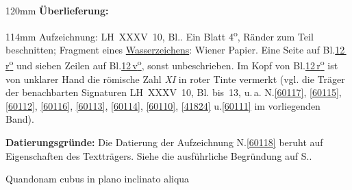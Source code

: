 %
\frenchspacing%
\begin{ledgroupsized}[r]{120mm}%
\footnotesize%
\pstart%
\noindent\textbf{Überlieferung:}%
\pend%
\end{ledgroupsized}%
\begin{ledgroupsized}[r]{114mm}%
\footnotesize%
\pstart%
\parindent -6mm%
%
Aufzeichnung:
LH~XXXV~10, Bl..
Ein Blatt 4\textsuperscript{o},
Ränder zum Teil beschnitten;
Fragment eines \href{\Scan{LH_35_10_14_012wz}}{Wasserzeichens}:
Wiener Papier.
Eine Seite auf Bl.\;\href{\Scan{LH_35_10_14_012r}}{12\,r\textsuperscript{o}} und sieben Zeilen auf Bl.\;\href{\Scan{LH_35_10_14_012v}}{12\,v\textsuperscript{o}}, sonst unbeschrieben.
Im Kopf von Bl.\;\href{\Scan{LH_35_10_14_012r}}{12\,r\textsuperscript{o}} ist von unklarer Hand die römische Zahl \textit{XI} in roter Tinte vermerkt
(vgl. die Träger der benachbarten Signaturen LH~XXXV~10, Bl. bis~13,
u.\,a.
N.\;\ref{60117},
\ref{60115},
\ref{60112},
\ref{60116},
\ref{60113},
\ref{60114},
\ref{60110}, 
\ref{41824}
u.\;\ref{60111}
im vorliegenden Band).
\pend%
\end{ledgroupsized}%
\vspace{5mm}%
\begin{ledgroup}%
\footnotesize%
\pstart%
\noindent%
\textbf{Datierungsgründe:}
Die Datierung der Aufzeichnung N.\;\ref{60118} beruht auf Eigenschaften des Textträgers.
Siehe die ausführliche Begründung auf S.\;\pageref{60118_dat}.%
\pend%
\end{ledgroup}%
%
\frenchspacing%
\vspace{8mm}%
\normalsize%
\pstart%
\noindent%
%
%
Quandonam%
cubus%
in plano inclinato%
aliqua
